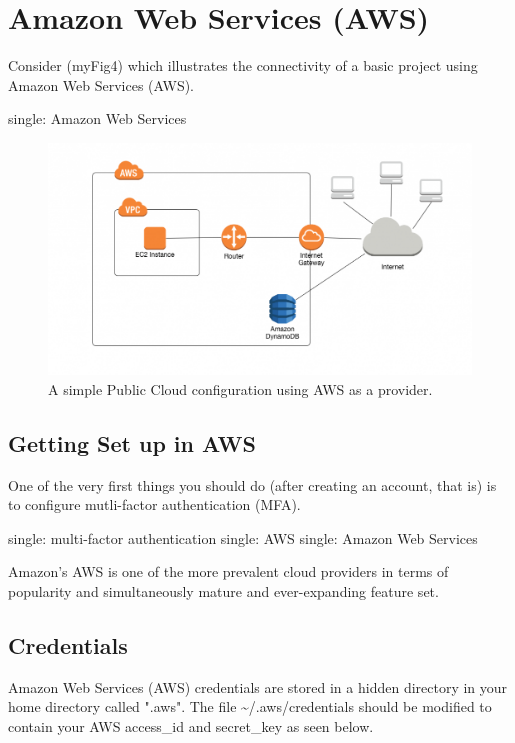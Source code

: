 \section{Amazon Web Services (AWS)}

\justify
Consider ({myFig4}) which illustrates the connectivity of a basic
project using Amazon Web Services (AWS).

single: Amazon Web Services

\begin{figure}
  \includegraphics[scale=0.45]{../images/ddb-no-vpc-endpoint-1024x561.png}
  \caption{A simple Public Cloud configuration using AWS as a provider.}
\end{figure}

\subsection{Getting Set up in AWS}

\justify
One of the very first things you should do (after creating an account,
that is) is to configure mutli-factor authentication (MFA).

single: multi-factor authentication
single: AWS single: Amazon Web Services

\justify
Amazon's AWS is one of the more prevalent cloud providers in terms of
popularity and simultaneously mature and ever-expanding feature set.

\subsection{Credentials}

\justify
Amazon Web Services (AWS) credentials are stored in a hidden directory
in your home directory called ".aws". The file
\textasciitilde{}/.aws/credentials should be modified to contain your
AWS access\_id and secret\_key as seen below.

